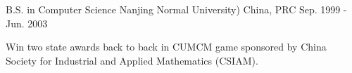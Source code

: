 

\begin{cventries}

  \cventry
    {B.S. in Computer Science} %
    {Nanjing Normal University)} %
    {China, PRC} %
    {Sep. 1999 - Jun. 2003} %
    {
      \begin{cvitems} %
        \item {Win two state awards back to back in CUMCM game sponsored by China Society for Industrial and Applied Mathematics (CSIAM).}
      \end{cvitems}
    }

\end{cventries}
